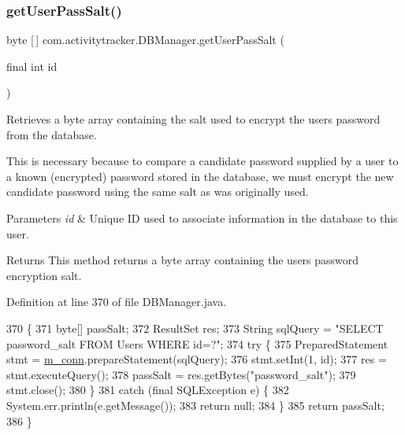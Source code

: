 \subsubsection{\texorpdfstring{get\+User\+Pass\+Salt()}{getUserPassSalt()}}
{\footnotesize\ttfamily byte \mbox{[}$\,$\mbox{]} com.\+activitytracker.\+D\+B\+Manager.\+get\+User\+Pass\+Salt (\begin{DoxyParamCaption}\item[{final int}]{id }\end{DoxyParamCaption})}

Retrieves a byte array containing the salt used to encrypt the user\textquotesingle{}s password from the database.

This is necessary because to compare a candidate password supplied by a user to a known (encrypted) password stored in the database, we must encrypt the new candidate password using the same salt as was originally used.


\begin{DoxyParams}{Parameters}
{\em id} & Unique ID used to associate information in the database to this user.\\
\hline
\end{DoxyParams}
\begin{DoxyReturn}{Returns}
This method returns a byte array containing the user\textquotesingle{}s password encryption salt. 
\end{DoxyReturn}


Definition at line 370 of file D\+B\+Manager.\+java.


\begin{DoxyCode}
370                                                 \{
371         byte[] passSalt;
372         ResultSet res;
373         String sqlQuery = \textcolor{stringliteral}{"SELECT password\_salt FROM Users WHERE id=?"};
374         \textcolor{keywordflow}{try} \{
375             PreparedStatement stmt = \mbox{\hyperlink{classcom_1_1activitytracker_1_1_d_b_manager_a064088d13ac09eb147fdc19268771521}{m\_conn}}.prepareStatement(sqlQuery);
376             stmt.setInt(1, \textcolor{keywordtype}{id});
377             res = stmt.executeQuery();
378             passSalt = res.getBytes(\textcolor{stringliteral}{"password\_salt"});
379             stmt.close();
380         \}
381         \textcolor{keywordflow}{catch} (\textcolor{keyword}{final} SQLException e) \{
382             System.err.println(e.getMessage());
383             \textcolor{keywordflow}{return} null;
384         \}
385         \textcolor{keywordflow}{return} passSalt;
386     \}
\end{DoxyCode}
\mbox{\label{classcom_1_1activitytracker_1_1_d_b_manager_a4e695c111b877cfd1d918602551f65a1}} 
